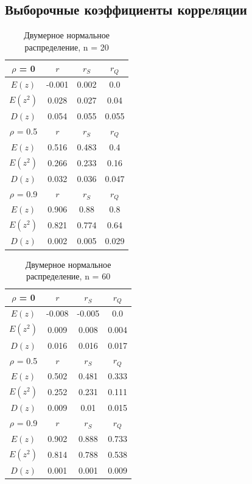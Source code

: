 \documentclass[../body.tex]{subfiles}
\begin{document}
	
	\subsection{Выборочные коэффициенты корреляции}
	
	\begin{table}[H]
		\centering
		\begin{tabular}{| c | c | c | c |}
			\hline  \hline
			$\rho$ = 0   & $r$    & $r_S$ & $r_Q$ \\ \hline
			$E(z)$       & -0.001 & 0.002 & 0.0   \\ \hline
			$E(z^2)$     & 0.028  & 0.027 & 0.04  \\ \hline
			$D(z)$       & 0.054  & 0.055 & 0.055 \\ \hline
			$\rho$ = 0.5 & $r$    & $r_S$ & $r_Q$ \\ \hline
			$E(z)$       & 0.516  & 0.483 & 0.4   \\ \hline
			$E(z^2)$     & 0.266  & 0.233 & 0.16  \\ \hline
			$D(z)$       & 0.032  & 0.036 & 0.047 \\ \hline
			$\rho$ = 0.9 & $r$    & $r_S$ & $r_Q$ \\ \hline
			$E(z)$       & 0.906  & 0.88  & 0.8   \\ \hline
			$E(z^2)$     & 0.821  & 0.774 & 0.64  \\ \hline
			$D(z)$       & 0.002  & 0.005 & 0.029 \\
			\hline \hline
		\end{tabular}
		\caption{Двумерное нормальное распределение, n = 20}
		\label{tab:n=20}
	\end{table}

	\begin{table}[H]
		\centering
		\begin{tabular}{| c | c | c | c |}
			\hline  \hline
			$\rho$ = 0   & $r$    & $r_S$  & $r_Q$ \\ \hline
			$E(z)$       & -0.008 & -0.005 & 0.0   \\ \hline
			$E(z^2)$     & 0.009  & 0.008  & 0.004 \\ \hline
			$D(z)$       & 0.016  & 0.016  & 0.017 \\ \hline
			$\rho$ = 0.5 & $r$    & $r_S$  & $r_Q$ \\ \hline
			$E(z)$       & 0.502  & 0.481  & 0.333 \\ \hline
			$E(z^2)$     & 0.252  & 0.231  & 0.111 \\ \hline
			$D(z)$       & 0.009  & 0.01   & 0.015 \\ \hline
			$\rho$ = 0.9 & $r$    & $r_S$  & $r_Q$ \\ \hline
			$E(z)$       & 0.902  & 0.888  & 0.733 \\ \hline
			$E(z^2)$     & 0.814  & 0.788  & 0.538 \\ \hline
			$D(z)$       & 0.001  & 0.001  & 0.009 \\
			\hline \hline
		\end{tabular}
	\caption{Двумерное нормальное распределение, n = 60}
	\label{tab:n=60}
	\end{table}
\end{document}
